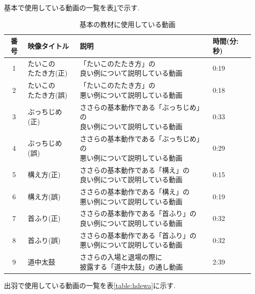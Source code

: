 \documentclass[12pt]{ltjsarticle}
\begin{document}
基本で使用している動画の一覧を表\ref{table:hkihon}で示す.
\begin{table}[h]
  \caption{基本の教材に使用している動画}
  \label{table:hkihon}
  \centering
  {\renewcommand\arraystretch{2.0}
   \begin{tabular}{clll}
    \hline
    番号 & 映像タイトル & 説明 & 時間(分:秒) \\
  
    \hline \hline
    1 &  \shortstack{たいこの\\たたき方(正)} &  \shortstack{「たいこのたたき方」の\\良い例について説明している動画} & 0:19 \\
    2 &  \shortstack{たいこの\\たたき方(誤)} &  \shortstack{「たいこのたたき方」の\\悪い例について説明している動画} & 0:18 \\
    3 &  ぶっちじめ(正) &  \shortstack{ささらの基本動作である「ぶっちじめ」の\\良い例について説明している動画} & 0:33 \\
    4 & ぶっちじめ(誤) &  \shortstack{ささらの基本動作である「ぶっちじめ」の\\悪い例について説明している動画} & 0:29 \\
    5 & 構え方(正)  &  \shortstack{ささらの基本動作である「構え」の\\良い例について説明している動画} & 0:15\\
    6 & 構え方(誤) &  \shortstack{ささらの基本動作である「構え」の\\悪い例について説明している動画} & 0:19\\
    7 & 首ふり(正)  &  \shortstack{ささらの基本動作である「首ふり」の\\良い例について説明している動画} & 0:32 \\
    8 & 首ふり(誤) &  \shortstack{ささらの基本動作である「首ふり」の\\悪い例について説明している動画} & 0:32 \\
    9 & 道中太鼓 &  \shortstack{ささらの入場と退場の際に\\披露する「道中太鼓」の通し動画}& 2:39 \\

   
    \hline
   \end{tabular}
  }
 \end{table}

\clearpage

出羽で使用している動画の一覧を表\ref{table:hdewa}に示す.
\end{document}
